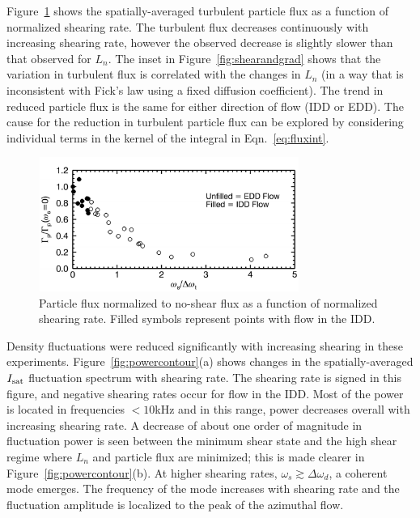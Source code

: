 \documentclass[aps,prl,amsmath,amssymb,preprint,superscriptaddress]{revtex4}
\begin{document}
Figure~\ref{fig:fluxvsshear} shows the spatially-averaged turbulent
particle flux as a function of normalized shearing rate.  The
turbulent flux decreases continuously with increasing shearing rate,
however the observed decrease is slightly slower than that observed
for $L_n$.  The inset in Figure~\ref{fig:shearandgrad} shows that the variation in
turbulent flux is correlated with the changes in $L_n$ (in a way
that is inconsistent with Fick's law using a fixed diffusion coefficient).  The
trend in reduced particle flux is the same for either direction of
flow (IDD or EDD).  The cause for the reduction in turbulent particle
flux can be explored by considering individual terms in the kernel of
the integral in Eqn.~\ref{eq:fluxint}.


\begin{figure}[!htbp]
\centerline{
\includegraphics[width=8.5cm]{fluxvsshear}}
\caption{\label{fig:fluxvsshear} Particle flux normalized to no-shear
  flux as a function of normalized shearing rate. Filled symbols
  represent points with flow in the IDD.}
\end{figure}


Density fluctuations were reduced significantly with increasing
shearing in these experiments.  Figure~\ref{fig:powercontour}(a) shows
changes in the spatially-averaged $I_{\rm sat}$ fluctuation spectrum
with shearing rate.  The shearing rate is signed in this figure, and
negative shearing rates occur for flow in the IDD. Most of the power
is located in frequencies $<10$kHz and in this range, power decreases
overall with increasing shearing rate.  A decrease of about one order
of magnitude in fluctuation power is seen between the minimum shear
state and the high shear regime where $L_n$ and particle flux are
minimized; this is made clearer in Figure~\ref{fig:powercontour}(b).  At
higher shearing rates, $\omega_s \gtrsim \Delta \omega_d$, a coherent
mode emerges.  The frequency of the mode increases with shearing rate
and the fluctuation amplitude is localized to the peak of the
azimuthal flow.
\end{document}
